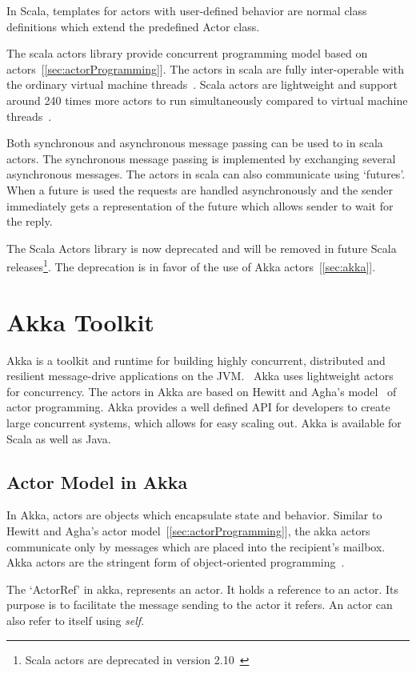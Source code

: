  In Scala, templates for actors with user-defined behavior are normal class definitions which extend the predefined Actor class.

  The scala actors library provide concurrent programming model based on actors~[\autoref{sec:actorProgramming}]. The actors in scala are fully inter-operable with the ordinary virtual machine threads~\cite{Haller}. Scala actors are lightweight and support around 240 times more actors to run simultaneously compared to virtual machine threads~\cite{Haller}.

  Both synchronous and asynchronous message passing can be used to in scala actors. The synchronous message passing is implemented by exchanging several asynchronous messages. The actors in scala can also communicate using ‘futures’. When a future is used the requests are handled asynchronously and the sender immediately gets a representation of the future which allows sender to wait for the reply.~\cite{scalaActors}

  The Scala Actors library is now deprecated and will be removed in future Scala releases\footnote{Scala actors are deprecated in version 2.10~\cite{scalaActorsAPI}}. The deprecation is in favor of the use of Akka actors~[\autoref{sec:akka}].

\section{Akka Toolkit}
\label{sec:akka}
Akka is a toolkit and runtime for building highly concurrent, distributed and resilient message-drive applications on the JVM.~\cite{akkaHome} Akka uses lightweight actors for concurrency. The actors in Akka are based on Hewitt and Agha's model~\cite{agha, hewitt} of actor programming. Akka provides a well defined API for developers to create large concurrent systems, which allows for easy scaling out.
  Akka is available for Scala as well as Java.

  \subsection{Actor Model in Akka}
  In Akka, actors are objects which encapsulate state and behavior. Similar to Hewitt and Agha's actor model~[\autoref{sec:actorProgramming}], the akka actors communicate only by messages which are placed into the recipient’s mailbox. Akka actors are the stringent form of object-oriented programming~\cite{akkaActorSystem}.

  The ‘ActorRef’ in akka, represents an actor. It holds a reference to an actor. Its purpose is to facilitate the message sending to the actor it refers. An actor can also refer to itself using \emph{self}. ~\cite{akkaJavaDoc}

